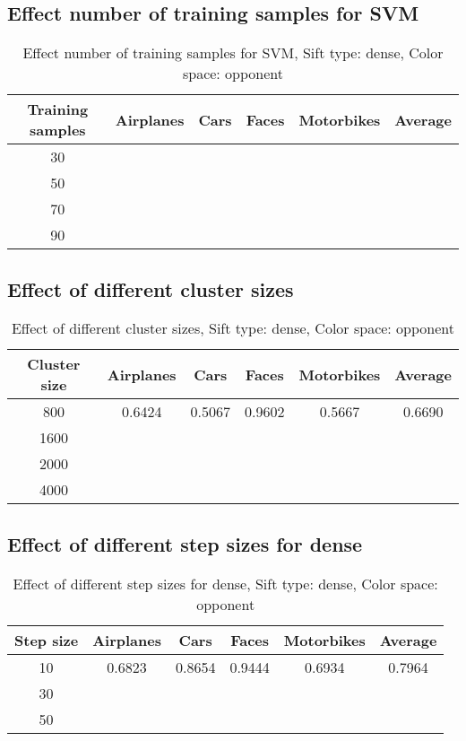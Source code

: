 \subsection{Effect number of training samples for SVM}

\begin{table}[h]
\begin{tabular}{|c|ccccc|}
\hline
\textbf{Training samples} & \textbf{Airplanes} & \textbf{Cars} & \textbf{Faces} & \textbf{Motorbikes} & \textbf{Average}\\
\hline
30 & & & & & \\
50 & & & & & \\
70 & & & & & \\
90 & & & & & \\
\hline
\end{tabular}
\caption{Effect number of training samples for SVM, Sift type: dense, Color space: opponent}
\end{table}


\subsection{Effect of different cluster sizes}

\begin{table}[h]
\begin{tabular}{|c|ccccc|}
\hline
\textbf{Cluster size} & \textbf{Airplanes} & \textbf{Cars} & \textbf{Faces} & \textbf{Motorbikes} & \textbf{Average}\\
\hline
800 & 0.6424 & 0.5067 & 0.9602 & 0.5667 & 0.6690\\
1600 & & & & & \\
2000 & & & & & \\
4000 & & & & & \\
\hline
\end{tabular}
\caption{Effect of different cluster sizes, Sift type: dense, Color space: opponent}
\end{table}

\subsection{Effect of different step sizes for dense}

\begin{table}[H]
\begin{tabular}{|c|ccccc|}
\hline
\textbf{Step size} & \textbf{Airplanes} & \textbf{Cars} & \textbf{Faces} & \textbf{Motorbikes} & \textbf{Average}\\
\hline
10 & 0.6823 & 0.8654 & 0.9444 & 0.6934 & 0.7964\\
30 & & & & & \\
50 & & & & & \\
\hline
\end{tabular}
\caption{Effect of different step sizes for dense, Sift type: dense, Color space: opponent}
\end{table}


